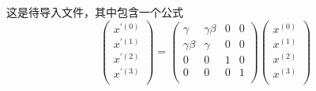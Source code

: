 这是待导入文件，其中包含一个公式
\begin{equation}
	\left(
		\begin{matrix}
			x^{'(0)} \\
			x^{'(1)} \\
			x^{'(2)} \\
			x^{'(3)} \\
		\end{matrix}
	\right)
	=
	\left(
		\begin{matrix}
			\gamma      & \gamma\beta & 0 & 0 \\
			\gamma\beta & \gamma      & 0 & 0 \\
			0           & 0           & 1 & 0 \\
			0           & 0           & 0 & 1 \\
		\end{matrix}
	\right)
	\left(
		\begin{matrix}
			x^{(0)} \\
			x^{(1)} \\
			x^{(2)} \\
			x^{(3)} \\
		\end{matrix}
	\right)
\end{equation}